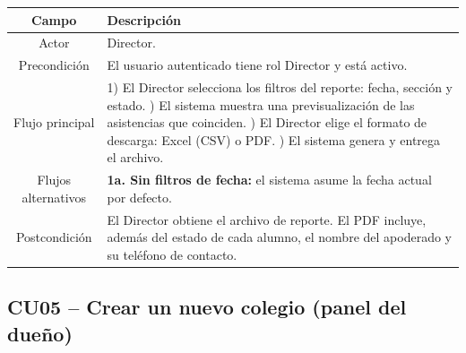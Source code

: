 \documentclass[a4paper,12pt]{article}
\begin{document}
\begin{table}[H]
\centering
\begin{tabularx}{\linewidth}{C X}
\toprule
\textbf{Campo} & \textbf{Descripción} \\
\midrule
Actor & Director. \\
\addlinespace
Precondición & El usuario autenticado tiene rol Director y está activo. \\
\addlinespace
Flujo principal &
  1) El Director selecciona los filtros del reporte: fecha, sección y estado.
     ) El sistema muestra una previsualización de las asistencias que coinciden.
     ) El Director elige el formato de descarga: Excel (CSV) o PDF. ) El sistema genera y entrega el archivo. \\
\addlinespace
Flujos alternativos &
  \textbf{1a. Sin filtros de fecha:} el sistema asume la fecha actual por
  defecto. \\
\addlinespace
Postcondición &
  El Director obtiene el archivo de reporte. El PDF incluye, además del estado
  de cada alumno, el nombre del apoderado y su teléfono de contacto. \\
\bottomrule
\end{tabularx}
\end{table}

\subsection{CU05 -- Crear un nuevo colegio (panel del dueño)}
\end{document}
